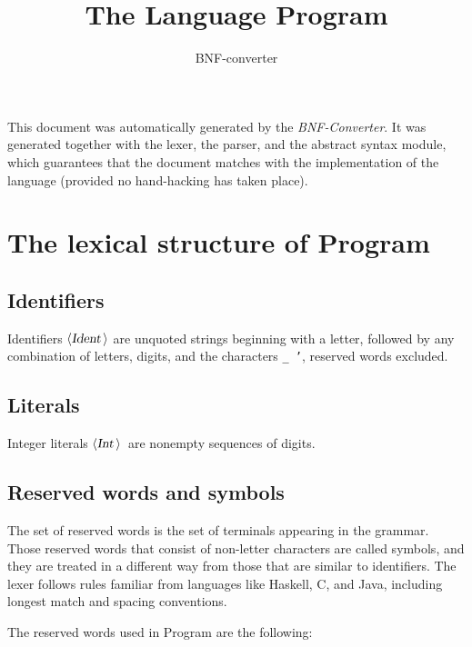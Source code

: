 \documentclass[a4paper,11pt]{article}
\title{The Language Program}
\author{BNF-converter}
\begin{document}
\maketitle


\newcommand{\emptyP}{\mbox{$\epsilon$}}
\newcommand{\terminal}[1]{\mbox{{\texttt {#1}}}}
\newcommand{\nonterminal}[1]{\mbox{$\langle \mbox{{\sl #1 }} \! \rangle$}}
\newcommand{\arrow}{\mbox{::=}}
\newcommand{\delimit}{\mbox{$|$}}
\newcommand{\reserved}[1]{\mbox{{\texttt {#1}}}}
\newcommand{\literal}[1]{\mbox{{\texttt {#1}}}}
\newcommand{\symb}[1]{\mbox{{\texttt {#1}}}}

This document was automatically generated by the {\em BNF-Converter}.
It was generated together with the lexer, the parser, and the
abstract syntax module, which guarantees that the document
matches with the implementation of the language
(provided no hand-hacking has taken place).

\section*{The lexical structure of Program}

\subsection*{Identifiers}
Identifiers \nonterminal{Ident} are unquoted strings beginning with a letter,
followed by any combination of letters, digits, and the characters {\tt \_ '},
reserved words excluded.
\subsection*{Literals}
Integer literals \nonterminal{Int}\ are nonempty sequences of digits.

\subsection*{Reserved words and symbols}
The set of reserved words is the set of terminals appearing in the grammar. Those reserved words that consist of non-letter characters are called symbols, and they are treated in a different way from those that are similar to identifiers. The lexer follows rules familiar from languages like Haskell, C, and Java, including longest match and spacing conventions.

The reserved words used in Program are the following: \\
\end{document}
